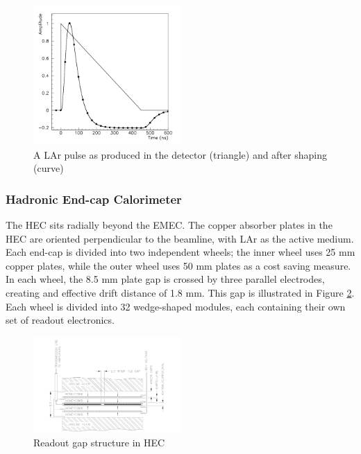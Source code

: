 \begin{figure}
        \centering
	\includegraphics[width=0.5\textwidth]{figures/ch4/lar_pulse.png}
	\caption{A LAr pulse as produced in the detector (triangle) and after shaping (curve) \cite{lar_tdr}}
	\label{fig:lar_pulse}
\end{figure}

\subsubsection{Hadronic End-cap Calorimeter}
The HEC sits radially beyond the EMEC. The copper absorber plates in the HEC are oriented perpendicular to the beamline, with LAr as the active medium. Each end-cap is divided into two independent wheels; the inner wheel uses 25 mm copper plates, while the outer wheel uses 50 mm plates as a cost saving measure. In each wheel, the 8.5 mm plate gap is crossed by three parallel electrodes, creating and effective drift distance of 1.8 mm. This gap is illustrated in Figure \ref{fig:hec}. Each wheel is divided into 32 wedge-shaped modules, each containing their own set of readout electronics.\par

\begin{figure}
        \centering
	\includegraphics[width=0.5\textwidth]{figures/ch4/hec.png}
	\caption{Readout gap structure in HEC \cite{lar_tdr}}
	\label{fig:hec}
\end{figure}

